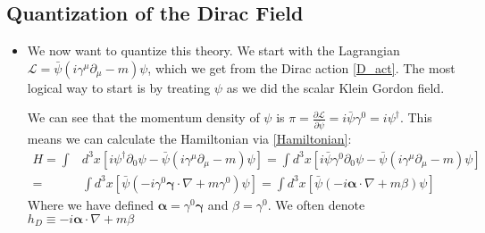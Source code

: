 \documentclass[11pt]{article}
\numberwithin{equation}{section}
\begin{document}
  \subsection{Quantization of the Dirac Field}
  \begin{itemize}
      \item We now want to quantize this theory. We start with the Lagrangian $\mathcal{L} = \bar{\psi}(i\gamma^{\mu}\partial_{\mu}-m)\psi$, which we get from the Dirac action \ref{D_act}. The most logical way to start is by treating $\psi$ as we did the scalar Klein Gordon field.

       We can see that the momentum density of $\psi$ is $\pi = \frac{\partial \mathcal{L}}{\partial \dot{\psi}} =i \bar{\psi}\gamma^{0} = i\psi^{\dagger} $. This means we can calculate the Hamiltonian via \ref{Hamiltonian}:
    \begin{align}
    \label{D_ham}
    H = \int &d^3x\left[i\psi^{\dagger}\partial_{0}\psi -\bar{\psi}(i\gamma^{\mu}\partial_{\mu}-m)\psi \right]  = \int d^3x\left[i\bar{\psi}\gamma^{0}\partial_{0}\psi -\bar{\psi}(i\gamma^{\mu}\partial_{\mu}-m)\psi \right] \nonumber \\
     = &\int d^3x\left[\bar{\psi}(-i\gamma^{0}\boldsymbol{\gamma}\cdot \nabla +m\gamma^{0})\psi \right]   =  \int d^3x\left[\bar{\psi}(-i\boldsymbol{\alpha}\cdot \nabla +m\beta)\psi \right]   
    \end{align}
    Where we have defined $\boldsymbol{\alpha} =\gamma^{0}\boldsymbol{\gamma}$ and $\beta = \gamma^{0}$. We often denote $h_D \equiv -i\boldsymbol{\alpha}\cdot \nabla +m\beta$
  \end{itemize}    
\end{document}
